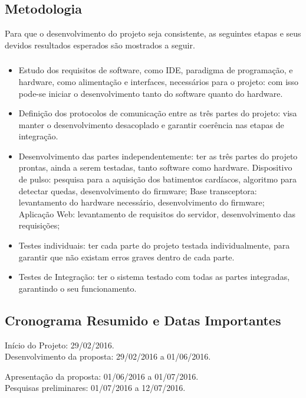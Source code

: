 \documentclass[a4paper]{article}
\begin{document}
\subsection{Metodologia}
Para que o desenvolvimento do projeto seja consistente, as seguintes etapas e seus devidos resultados esperados são mostrados a seguir.

\subsubsection{}
\begin{itemize}
\item Estudo dos requisitos de software, como IDE, paradigma de programação, e hardware, como alimentação e interfaces, necessários para o projeto: com isso pode-se iniciar o desenvolvimento tanto do software quanto do hardware.
\item Definição dos protocolos de comunicação entre as três partes do projeto: visa manter o desenvolvimento desacoplado e garantir coerência nas etapas de integração.
\item Desenvolvimento das partes independentemente: ter as três partes do projeto prontas, ainda a serem testadas, tanto software como hardware.
\subitem Dispositivo de pulso: pesquisa para a aquisição dos batimentos cardíacos, algoritmo para detectar quedas, desenvolvimento do firmware;
\subitem Base transceptora: levantamento do hardware necessário, desenvolvimento do firmware;
\subitem Aplicação Web: levantamento de requisitos do servidor, desenvolvimento das requisições;
\item Testes individuais: ter cada parte do projeto testada individualmente, para garantir que não existam erros graves dentro de cada parte.
\item Testes de Integração: ter o sistema testado com todas as partes integradas, garantindo o seu funcionamento.
\end{itemize}

\subsection{Cronograma Resumido e Datas Importantes}
Início do Projeto: 29/02/2016. \\

Desenvolvimento da proposta: 29/02/2016 a 01/06/2016. 

Apresentação da proposta: 01/06/2016 a 01/07/2016. \\

Pesquisas preliminares: 01/07/2016 a 12/07/2016.
\end{document}
